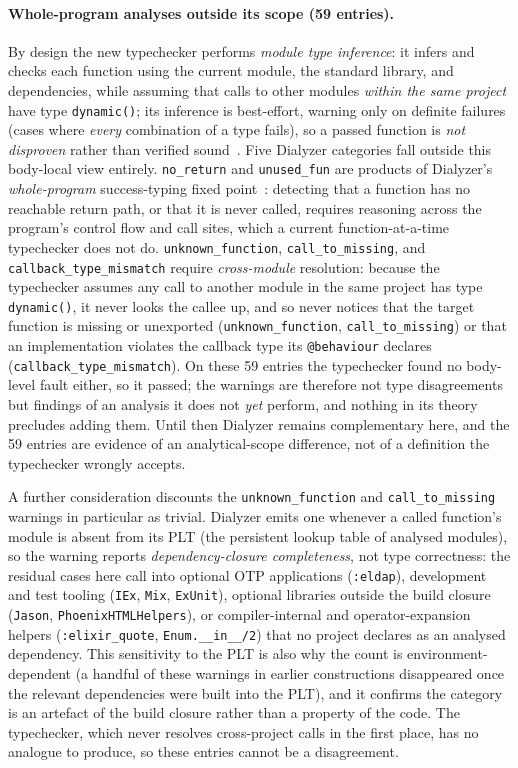 \paragraph{Whole-program analyses outside its scope (59 entries).}
By design the new typechecker performs \emph{module type inference}: it infers and checks each function using the current module, the standard library, and dependencies, while assuming that calls to other modules \emph{within the same project} have type \texttt{dynamic()}; its inference is best-effort, warning only on definite failures (cases where \emph{every} combination of a type fails), so a passed function is \emph{not disproven} rather than verified sound~\cite{elixir-set-theoretic-types}.
Five Dialyzer categories fall outside this body-local view entirely.
\texttt{no\_return} and \texttt{unused\_fun} are products of Dialyzer's \emph{whole-program} success-typing fixed point~\cite{lindahl2006practical}: detecting that a function has no reachable return path, or that it is never called, requires reasoning across the program's control flow and call sites, which a current function-at-a-time typechecker does not do.
\texttt{unknown\_function}, \texttt{call\_to\_missing}, and \texttt{callback\_type\_mismatch} require \emph{cross-module} resolution: because the typechecker assumes any call to another module in the same project has type \texttt{dynamic()}, it never looks the callee up, and so never notices that the target function is missing or unexported (\texttt{unknown\_function}, \texttt{call\_to\_missing}) or that an implementation violates the callback type its \texttt{@behaviour} declares (\texttt{callback\_type\_mismatch}).
On these 59 entries the typechecker found no body-level fault either, so it passed; the warnings are therefore not type disagreements but findings of an analysis it does not \emph{yet} perform, and nothing in its theory precludes adding them.
Until then Dialyzer remains complementary here, and the 59 entries are evidence of an analytical-scope difference, not of a definition the typechecker wrongly accepts.

A further consideration discounts the \texttt{unknown\_function} and \texttt{call\_to\_missing} warnings in particular as trivial.
Dialyzer emits one whenever a called function's module is absent from its PLT (the persistent lookup table of analysed modules), so the warning reports \emph{dependency-closure completeness}, not type correctness: the residual cases here call into optional OTP applications (\texttt{:eldap}), development and test tooling (\texttt{IEx}, \texttt{Mix}, \texttt{ExUnit}), optional libraries outside the build closure (\texttt{Jason}, \texttt{PhoenixHTMLHelpers}), or compiler-internal and operator-expansion helpers (\texttt{:elixir\_quote}, \texttt{Enum.\_\_in\_\_/2}) that no project declares as an analysed dependency.
This sensitivity to the PLT is also why the count is environment-dependent (a handful of these warnings in earlier constructions disappeared once the relevant dependencies were built into the PLT), and it confirms the category is an artefact of the build closure rather than a property of the code.
The typechecker, which never resolves cross-project calls in the first place, has no analogue to produce, so these entries cannot be a disagreement.

